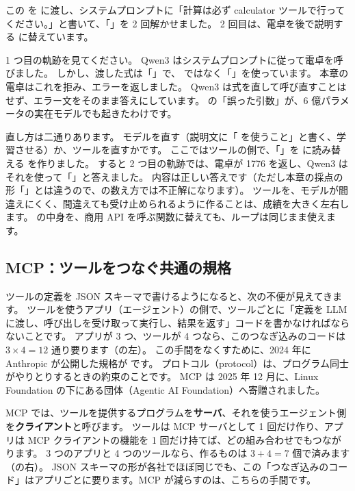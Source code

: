この  を  に渡し、システムプロンプトに「計算は必ず calculator ツールで行ってください。」と書いて、「」を 2 回解かせました。
2 回目は、電卓を後で説明する  に替えています。


1 つ目の軌跡を見てください。
Qwen3 はシステムプロンプトに従って電卓を呼びました。
しかし、渡した式は「」で、\code{*} ではなく「」を使っています。
本章の電卓はこれを拒み、エラーを返しました。
Qwen3 は式を直して呼び直すことはせず、エラー文をそのまま答えにしています。
の「誤った引数」が、6 億パラメータの実在モデルでも起きたわけです。

直し方は二通りあります。
モデルを直す（説明文に「\code{*} を使うこと」と書く、学習させる）か、ツールを直すかです。
ここではツールの側で、「」を \code{*} に読み替える  を作りました。
すると 2 つ目の軌跡では、電卓が 1776 を返し、Qwen3 はそれを使って「」と答えました。
内容は正しい答えです（ただし本章の採点の形「」とは違うので、の数え方では不正解になります）。
ツールを、モデルが間違えにくく、間違えても受け止められるように作ることは、成績を大きく左右します\cite{yang2024sweagent}。
 の中身を、商用 API を呼ぶ関数に替えても、ループは同じまま使えます。

\subsection{MCP：ツールをつなぐ共通の規格}

ツールの定義を JSON スキーマで書けるようになると、次の不便が見えてきます。
ツールを使うアプリ（エージェント）の側で、ツールごとに「定義を LLM に渡し、呼び出しを受け取って実行し、結果を返す」コードを書かなければならないことです。
アプリが 3 つ、ツールが 4 つなら、このつなぎ込みのコードは $3\times4=12$ 通り要ります（の左）。
この手間をなくすために、2024 年に Anthropic が公開した規格が です\cite{anthropic2024mcp}。
プロトコル（protocol）は、プログラム同士がやりとりするときの約束のことです。
MCP は 2025 年 12 月に、Linux Foundation の下にある団体（Agentic AI Foundation）へ寄贈されました。

MCP では、ツールを提供するプログラムを\textbf{サーバ}、それを使うエージェント側を\textbf{クライアント}と呼びます。
ツールは MCP サーバとして 1 回だけ作り、アプリは MCP クライアントの機能を 1 回だけ持てば、どの組み合わせでもつながります。
3 つのアプリと 4 つのツールなら、作るものは $3+4=7$ 個で済みます（の右）。
JSON スキーマの形が各社でほぼ同じでも、この「つなぎ込みのコード」はアプリごとに要ります。MCP が減らすのは、こちらの手間です。

